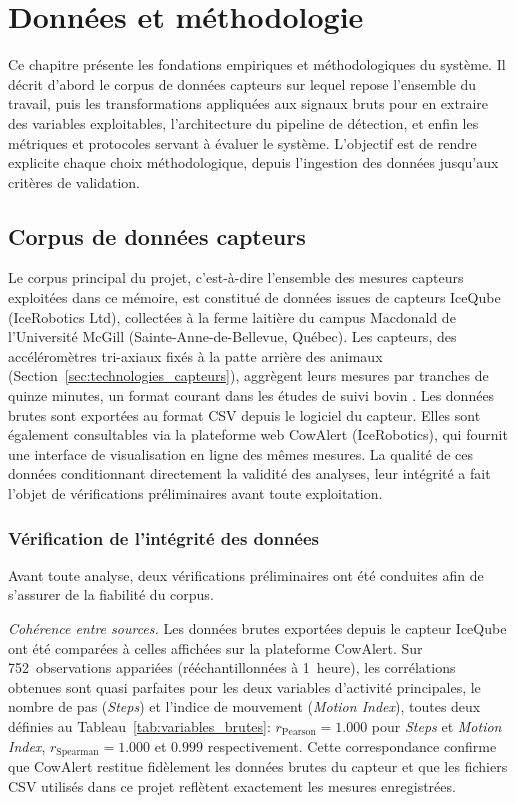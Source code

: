 \chapter{Données et méthodologie}
\label{chapitre:methodologie}

Ce chapitre présente les fondations empiriques et méthodologiques du système. Il décrit
d'abord le corpus de données capteurs sur lequel repose l'ensemble du travail, puis les
transformations appliquées aux signaux bruts pour en extraire des variables exploitables,
l'architecture du pipeline de détection, et enfin les métriques et protocoles servant à
évaluer le système. L'objectif est de rendre explicite chaque choix méthodologique, depuis
l'ingestion des données jusqu'aux critères de validation.

\section{Corpus de données capteurs}
\label{sec:donnees}

Le corpus principal du projet, c'est-à-dire l'ensemble des mesures capteurs exploitées dans
ce mémoire, est constitué de données issues de capteurs IceQube (IceRobotics Ltd),
collectées à la ferme laitière du campus Macdonald de l'Université McGill
(Sainte-Anne-de-Bellevue, Québec). Les capteurs, des
accéléromètres tri-axiaux fixés à la patte arrière des animaux
(Section~\ref{sec:technologies_capteurs}), aggrègent leurs mesures par tranches de quinze
minutes, un format courant dans les études de suivi bovin
\citep{ledgerwood2010lying,benaissa2019calving}. Les données brutes sont exportées au
format CSV depuis le logiciel du capteur. Elles sont également consultables via la
plateforme web CowAlert (IceRobotics), qui fournit une interface de visualisation
en ligne des mêmes mesures. La qualité de ces données conditionnant directement la validité
des analyses, leur intégrité a fait l'objet de vérifications préliminaires avant toute
exploitation.

\subsection{Vérification de l'intégrité des données}
Avant toute analyse, deux vérifications préliminaires ont été conduites afin de s'assurer
de la fiabilité du corpus.

\textit{Cohérence entre sources.}
Les données brutes exportées depuis le capteur IceQube ont été comparées à celles affichées
sur la plateforme CowAlert. Sur 752~observations appariées (rééchantillonnées à 1~heure),
les corrélations obtenues sont quasi parfaites pour les deux variables d'activité
principales, le nombre de pas (\textit{Steps}) et l'indice de mouvement
(\textit{Motion Index}), toutes deux définies au Tableau~\ref{tab:variables_brutes}:
$r_{\text{Pearson}} = 1.000$ pour \textit{Steps} et \textit{Motion Index}, $r_{\text{Spearman}} = 1.000$
et $0.999$ respectivement. Cette correspondance
confirme que CowAlert restitue fidèlement les données brutes du capteur et que les fichiers
CSV utilisés dans ce projet reflètent exactement les mesures enregistrées.

